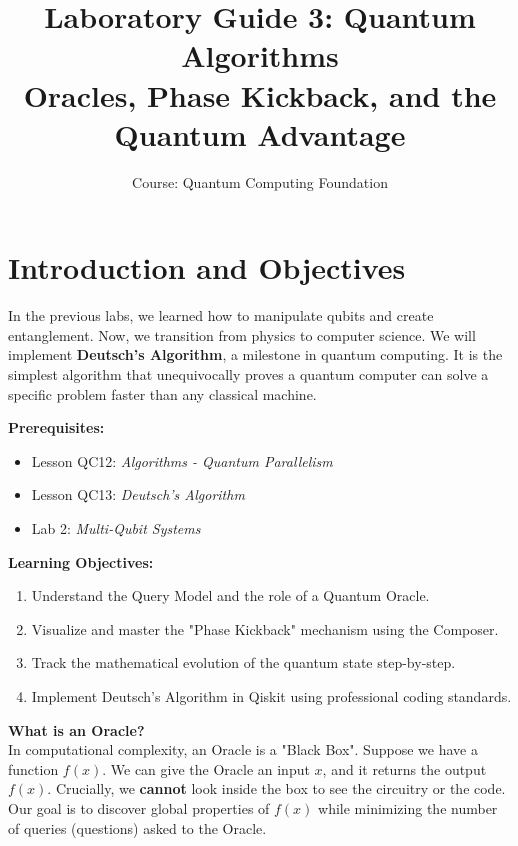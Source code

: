 \documentclass[a4paper,11pt]{article}
\title{\textbf{Laboratory Guide 3: Quantum Algorithms}\\
\large Oracles, Phase Kickback, and the Quantum Advantage}
\author{Course: Quantum Computing Foundation}
\date{}
\begin{document}
\maketitle

\section{Introduction and Objectives}
In the previous labs, we learned how to manipulate qubits and create entanglement. Now, we transition from physics to computer science. We will implement \textbf{Deutsch's Algorithm}, a milestone in quantum computing. It is the simplest algorithm that unequivocally proves a quantum computer can solve a specific problem faster than any classical machine.

\vspace{0.3cm}
\noindent \textbf{Prerequisites:}
\begin{itemize}
    \item Lesson QC12: \textit{Algorithms - Quantum Parallelism}
    \item Lesson QC13: \textit{Deutsch's Algorithm}
    \item Lab 2: \textit{Multi-Qubit Systems}
\end{itemize}

\noindent \textbf{Learning Objectives:}
\begin{enumerate}
    \item Understand the Query Model and the role of a Quantum Oracle.
    \item Visualize and master the "Phase Kickback" mechanism using the Composer.
    \item Track the mathematical evolution of the quantum state step-by-step.
    \item Implement Deutsch's Algorithm in Qiskit using professional coding standards.
\end{enumerate}

\begin{warningbox}
\textbf{What is an Oracle?}\\
In computational complexity, an Oracle is a "Black Box". Suppose we have a function $f(x)$. We can give the Oracle an input $x$, and it returns the output $f(x)$. Crucially, we \textbf{cannot} look inside the box to see the circuitry or the code. Our goal is to discover global properties of $f(x)$ while minimizing the number of queries (questions) asked to the Oracle.
\end{warningbox}
\end{document}
